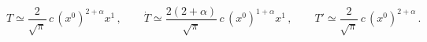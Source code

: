 \begin{equation}
 T \simeq \frac{2}{\sqrt{\pi}}\, c\,(x^0)^{2+\alpha}x^1\,,\qquad
  \dot{T}\simeq\frac{2(2+\alpha)}{\sqrt{\pi}}\,c\,
  (x^0)^{1+\alpha}x^1\,,\qquad
  T'\simeq\frac{2}{\sqrt{\pi}}\, c\,(x^0)^{2+\alpha}\,.
\end{equation}

